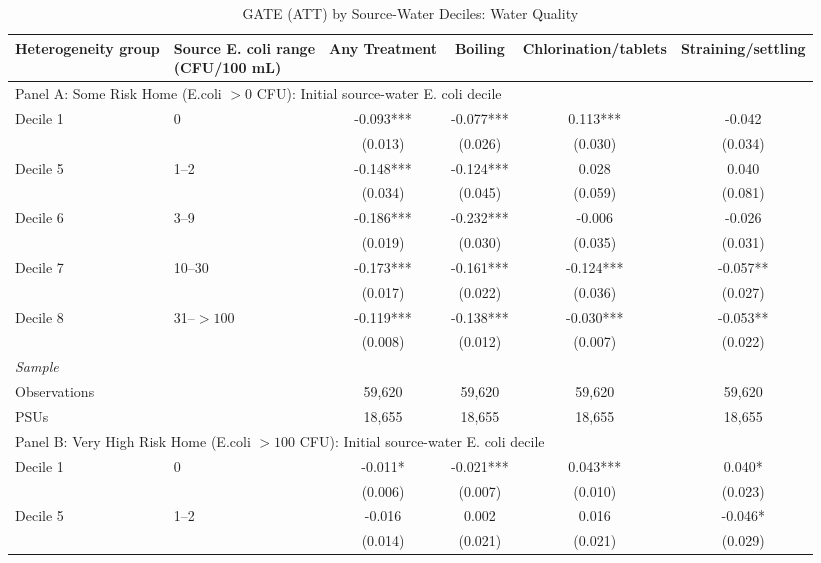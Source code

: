 \begin{landscape}
\begin{table}[p]
\centering
\caption{GATE (ATT) by Source-Water Deciles: Water Quality}
\label{tab:table_gate_main_deciles-ecoli}
\scriptsize\setlength{\tabcolsep}{4pt}
\begin{adjustbox}{max width=\linewidth, center}
\begin{tabular}{llcccc}
\toprule
Heterogeneity group & \shortstack{Source E. coli range\\(CFU/100 mL)} & Any Treatment & Boiling & Chlorination/tablets & Straining/settling \\
\midrule
\multicolumn{6}{l}{Panel A: Some Risk Home (E.coli $>0$ CFU): Initial source-water E. coli decile} \\
Decile 1 & 0 & -0.093*** & -0.077*** & 0.113*** & -0.042 \\
 &  & (0.013) & (0.026) & (0.030) & (0.034) \\
Decile 5 & 1--2 & -0.148*** & -0.124*** & 0.028 & 0.040 \\
 &  & (0.034) & (0.045) & (0.059) & (0.081) \\
Decile 6 & 3--9 & -0.186*** & -0.232*** & -0.006 & -0.026 \\
 &  & (0.019) & (0.030) & (0.035) & (0.031) \\
Decile 7 & 10--30 & -0.173*** & -0.161*** & -0.124*** & -0.057** \\
 &  & (0.017) & (0.022) & (0.036) & (0.027) \\
Decile 8 & 31--$>100$ & -0.119*** & -0.138*** & -0.030*** & -0.053** \\
 &  & (0.008) & (0.012) & (0.007) & (0.022) \\
\multicolumn{6}{l}{\textit{Sample}} \\
\quad Observations &  & 59,620 & 59,620 & 59,620 & 59,620 \\
\quad PSUs &  & 18,655 & 18,655 & 18,655 & 18,655 \\
\midrule
\multicolumn{6}{l}{Panel B: Very High Risk Home (E.coli $>100$ CFU): Initial source-water E. coli decile} \\
Decile 1 & 0 & -0.011* & -0.021*** & 0.043*** & 0.040* \\
 &  & (0.006) & (0.007) & (0.010) & (0.023) \\
Decile 5 & 1--2 & -0.016 & 0.002 & 0.016 & -0.046* \\
 &  & (0.014) & (0.021) & (0.021) & (0.029) \\

\end{tabular}
\end{adjustbox}
\end{table}
\end{landscape}
